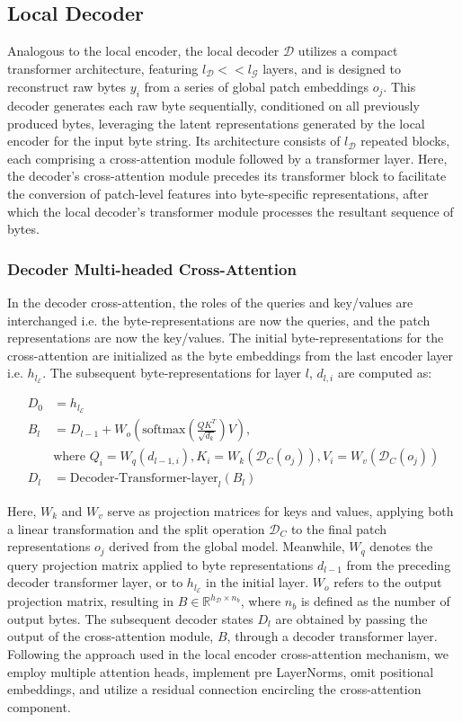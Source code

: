 \subsection{Local Decoder} 

Analogous to the local encoder, the local decoder $\mathcal{D}$ utilizes a compact transformer architecture, featuring $l_{\mathcal{D}} << l_{\mathcal{G}}$ layers, and is designed to reconstruct raw bytes $y_i$ from a series of global patch embeddings $o_j$. This decoder generates each raw byte sequentially, conditioned on all previously produced bytes, leveraging the latent representations generated by the local encoder for the input byte string. Its architecture consists of $l_{\mathcal{D}}$ repeated blocks, each comprising a cross-attention module followed by a transformer layer. Here, the decoder’s cross-attention module precedes its transformer block to facilitate the conversion of patch-level features into byte-specific representations, after which the local decoder’s transformer module processes the resultant sequence of bytes.

\subsubsection{Decoder Multi-headed Cross-Attention} 

In the decoder cross-attention, the roles of the queries and key/values are interchanged i.e. the byte-representations are now the queries, and the patch representations are now the key/values. The initial byte-representations for the cross-attention are initialized as the byte embeddings from the last encoder layer i.e. $h_{l_{\mathcal{E}}}$. The subsequent byte-representations for layer $l$, $d_{l,i}$ are computed as:

\begin{align}
D_0 &= h_{l_{\mathcal{E}}} \\
B_l &= D_{l-1} + W_o\left(\text{softmax}\left(\frac{QK^T}{\sqrt{d_k}}\right)V\right), \\
  &\text{where } Q_i = W_q(d_{l-1,i}), K_i = W_k(\mathcal{D}_C(o_j)), V_i = W_v(\mathcal{D}_C(o_j)) \\
  D_l &= \text{Decoder-Transformer-layer}_l(B_l)
\end{align}

Here, $W_k$ and $W_v$ serve as projection matrices for keys and values, applying both a linear transformation and the split operation $\mathcal{D}_C$ to the final patch representations $o_j$ derived from the global model. Meanwhile, $W_q$ denotes the query projection matrix applied to byte representations $d_{l-1}$ from the preceding decoder transformer layer, or to $h_{l_{\mathcal{E}}}$ in the initial layer. $W_o$ refers to the output projection matrix, resulting in $B \in \mathbb{R}^{h_{\mathcal{D}} \times n_b}$, where $n_b$ is defined as the number of output bytes. The subsequent decoder states $D_l$ are obtained by passing the output of the cross-attention module, $B$, through a decoder transformer layer. Following the approach used in the local encoder cross-attention mechanism, we employ multiple attention heads, implement pre LayerNorms, omit positional embeddings, and utilize a residual connection encircling the cross-attention component.

